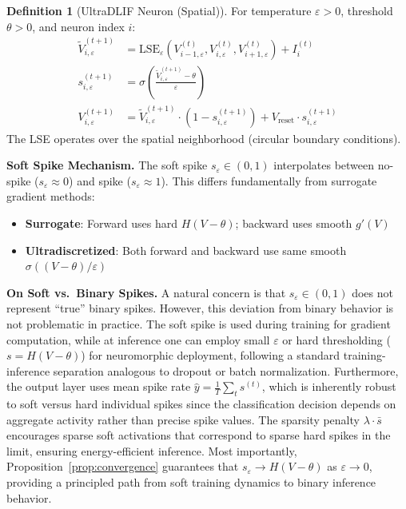 \documentclass{article}
\theoremstyle{plain}
\theoremstyle{definition}
\newtheorem{definition}[theorem]{Definition}
\theoremstyle{remark}
\newcommand{\lse}{\mathrm{LSE}}
\newcommand{\eps}{\varepsilon}
\begin{document}
\begin{definition}[UltraDLIF Neuron (Spatial)]
\label{def:ultradlif}
For temperature $\eps > 0$, threshold $\theta > 0$, and neuron index $i$:
\begin{align}
\tilde{V}_{i,\eps}^{(t+1)} &= \lse_\eps\left(V_{i-1,\eps}^{(t)}, V_{i,\eps}^{(t)}, V_{i+1,\eps}^{(t)}\right) + I_i^{(t)} \label{eq:ultradlif_voltage}\\
s_{i,\eps}^{(t+1)} &= \sigma\left(\frac{\tilde{V}_{i,\eps}^{(t+1)} - \theta}{\eps}\right) \label{eq:ultradlif_spike}\\
V_{i,\eps}^{(t+1)} &= \tilde{V}_{i,\eps}^{(t+1)} \cdot (1 - s_{i,\eps}^{(t+1)}) + V_\text{reset} \cdot s_{i,\eps}^{(t+1)} \label{eq:ultradlif_reset}
\end{align}
The LSE operates over the spatial neighborhood (circular boundary conditions).
\end{definition}

\textbf{Soft Spike Mechanism.} The soft spike $s_\eps \in (0,1)$ interpolates between no-spike ($s_\eps \approx 0$) and spike ($s_\eps \approx 1$). This differs fundamentally from surrogate gradient methods:
\begin{itemize}
    \item \textbf{Surrogate}: Forward uses hard $H(V - \theta)$; backward uses smooth $g'(V)$
    \item \textbf{Ultradiscretized}: Both forward and backward use same smooth $\sigma((V-\theta)/\eps)$
\end{itemize}


\textbf{On Soft vs.\ Binary Spikes.} A natural concern is that $s_\eps \in (0,1)$ does not represent ``true'' binary spikes. However, this deviation from binary behavior is not problematic in practice. The soft spike is used during training for gradient computation, while at inference one can employ small $\eps$ or hard thresholding ($s = H(V - \theta)$) for neuromorphic deployment, following a standard training-inference separation analogous to dropout or batch normalization. Furthermore, the output layer uses mean spike rate $\hat{y} = \frac{1}{T}\sum_t s^{(t)}$, which is inherently robust to soft versus hard individual spikes since the classification decision depends on aggregate activity rather than precise spike values. The sparsity penalty $\lambda \cdot \bar{s}$ encourages sparse soft activations that correspond to sparse hard spikes in the limit, ensuring energy-efficient inference. Most importantly, Proposition~\ref{prop:convergence} guarantees that $s_\eps \to H(V - \theta)$ as $\eps \to 0$, providing a principled path from soft training dynamics to binary inference behavior.
\end{document}
